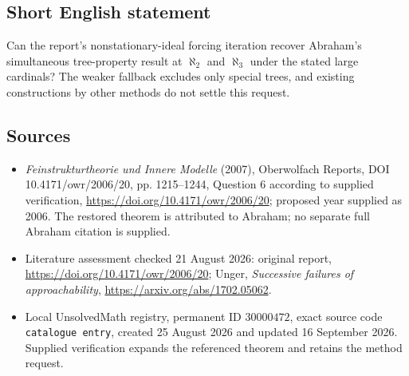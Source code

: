 \documentclass[11pt]{article}
\begin{document}
\subsection{Short English statement}
Can the report's nonstationary-ideal forcing iteration recover Abraham's simultaneous tree-property result at $\aleph_2$ and $\aleph_3$ under the stated large cardinals? The weaker fallback excludes only special trees, and existing constructions by other methods do not settle this request.
\subsection{Sources}
\begin{itemize}
\item \emph{Feinstrukturtheorie und Innere Modelle} (2007), Oberwolfach Reports, DOI 10.4171/owr/2006/20, pp. 1215--1244, Question 6 according to supplied verification, \url{https://doi.org/10.4171/owr/2006/20}; proposed year supplied as 2006. The restored theorem is attributed to Abraham; no separate full Abraham citation is supplied.
\item Literature assessment checked 21 August 2026: original report, \url{https://doi.org/10.4171/owr/2006/20}; Unger, \emph{Successive failures of approachability}, \url{https://arxiv.org/abs/1702.05062}.
\item Local UnsolvedMath registry, permanent ID $30000472$, exact source code \texttt{catalogue entry}, created 25 August 2026 and updated 16 September 2026. Supplied verification expands the referenced theorem and retains the method request.
\end{itemize}
\end{document}
